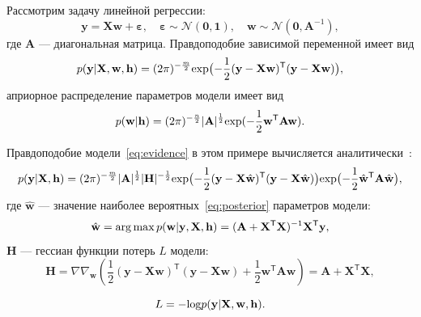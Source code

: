 \begin{example}
Рассмотрим задачу линейной регрессии:
\[
	\mathbf{y} =\mathbf{X} \mathbf{w} + \boldsymbol{\varepsilon},\quad \boldsymbol{\varepsilon}  \sim \mathcal{N}(\mathbf{0},\mathbf{1}),\quad \mathbf{w} \sim  \mathcal{N}(\mathbf{0},\mathbf{A}^{-1}),
\]
где $\mathbf{A}$ --- диагональная матрица. 
Правдоподобие зависимой переменной имеет вид
\begin{equation}
\label{eq:example1}
	p(\mathbf{y}|  \mathbf{X}, \mathbf{w}, \mathbf{h}) = (2\pi) ^{-\frac{m}{2}} \textnormal{exp} \bigl(-\frac{1}{2}(\mathbf{y} -\mathbf{X} \mathbf{w})^\mathsf{T}(\mathbf{y} - \mathbf{X}\mathbf{w})\bigr),
\end{equation}
априорное распределение параметров модели имеет вид
\begin{equation}
\label{eq:prior}	
p(\mathbf{w}|\mathbf{h}) =  (2\pi) ^{-\frac{n}{2}} |\mathbf{A}|^{\frac{1}{2}} \textnormal{exp} (-\frac{1}{2}\mathbf{w}^\mathsf{T}\mathbf{A}\mathbf{w}).
\end{equation}

Правдоподобие модели~\eqref{eq:evidence} в этом примере вычисляется аналитически~\cite{hyperopt}:
\begin{equation}
\label{eq:ground}
	p(\mathbf{y}|\mathbf{X},\mathbf{h})  =  (2\pi) ^{-\frac{m}{2}} |\mathbf{A}|^{\frac{1}{2}} |\mathbf{H}|^{-\frac{1}{2}}  \textnormal{exp}\bigl(-\frac{1}{2}(\mathbf{y} -\mathbf{X} \hat{\mathbf{w}})^\mathsf{T}(\mathbf{y} - \mathbf{X}\hat{\mathbf{w}})\bigr)\textnormal{exp} \bigl(-\frac{1}{2}\hat{\mathbf{w}}^\mathsf{T}\mathbf{A}\hat{\mathbf{w}}\bigr),
\end{equation}
где $\hat{\mathbf{w}}$ --- значение наиболее вероятных~\eqref{eq:posterior} параметров модели:
\[
	\hat{\mathbf{w}} = \operatorname*{arg\,max} p(\mathbf{w}|\mathbf{y}, \mathbf{X}, \mathbf{h}) = (\mathbf{A} + \mathbf{X}^\mathsf{T}\mathbf{X})^{-1}\mathbf{X}^\mathsf{T}\mathbf{y},
\]
$\mathbf{H}$ --- гессиан функции потерь $L$ модели:
\[
	\mathbf{H}	= \nabla \nabla_\mathbf{w} \left(\frac{1}{2} (\mathbf{y} -\mathbf{X} {\mathbf{w}})^\mathsf{T}(\mathbf{y} - \mathbf{X}{\mathbf{w}}) + \frac{1}{2}\mathbf{w}^\mathsf{T}\mathbf{A}\mathbf{w} \right) = \mathbf{A} + \mathbf{X}^\mathsf{T}\mathbf{X},
\]

\[ 
	L = - \textnormal{log} p(\mathbf{y}|  \mathbf{X}, \mathbf{w}, \mathbf{h}). 
\]
\end{example}

